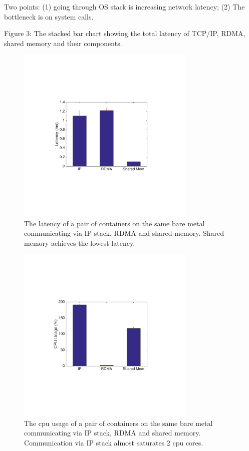 Two points: (1) going through OS stack is increasing network latency; (2) The bottleneck is on system calls.

Figure 3: The stacked bar chart showing the total latency of TCP/IP, RDMA, shared memory and their components.

\begin{figure}[!ht]
     \centering 
     \includegraphics[width=3.35in]{figures/motivation/eval_baremetal_latency.pdf} 
     \caption{\label{fig:eval_baremetal_latency} The latency of a pair of containers on the same bare metal communicating via IP stack, RDMA and shared memory. Shared memory achieves the lowest latency.} 
\end{figure} 


\begin{figure}[!ht]
     \centering 
     \includegraphics[width=3.35in]{figures/motivation/eval_baremetal_cpu.pdf} 
     \caption{\label{fig:eval_baremetal_cpu} The cpu usage of a pair of containers on the same bare metal communicating via IP stack, RDMA and shared memory. Communication via IP stack almost saturates 2 cpu cores.} 
\end{figure} 